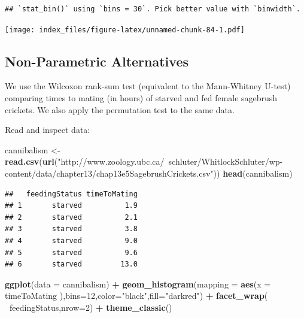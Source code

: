\documentclass[]{article}
\newenvironment{Shaded}{\begin{snugshade}}{\end{snugshade}}
\newcommand{\DataTypeTok}[1]{\textcolor[rgb]{0.13,0.29,0.53}{#1}}
\newcommand{\DecValTok}[1]{\textcolor[rgb]{0.00,0.00,0.81}{#1}}
\newcommand{\KeywordTok}[1]{\textcolor[rgb]{0.13,0.29,0.53}{\textbf{#1}}}
\newcommand{\NormalTok}[1]{#1}
\newcommand{\OperatorTok}[1]{\textcolor[rgb]{0.81,0.36,0.00}{\textbf{#1}}}
\newcommand{\StringTok}[1]{\textcolor[rgb]{0.31,0.60,0.02}{#1}}
\begin{document}
\begin{verbatim}
## `stat_bin()` using `bins = 30`. Pick better value with `binwidth`.
\end{verbatim}

\texttt{[image: index\_files/figure-latex/unnamed-chunk-84-1.pdf]}

\hypertarget{non-parametric-alternatives}{%
\subsection{Non-Parametric
Alternatives}\label{non-parametric-alternatives}}

We use the Wilcoxon rank-sum test (equivalent to the Mann-Whitney
U-test) comparing times to mating (in hours) of starved and fed female
sagebrush crickets. We also apply the permutation test to the same data.

Read and inspect data:

\begin{Shaded}
\begin{Highlighting}[]
\NormalTok{cannibalism <-}\StringTok{ }\KeywordTok{read.csv}\NormalTok{(}\KeywordTok{url}\NormalTok{(}\StringTok{"http://www.zoology.ubc.ca/~schluter/WhitlockSchluter/wp-content/data/chapter13/chap13e5SagebrushCrickets.csv"}\NormalTok{))}
\KeywordTok{head}\NormalTok{(cannibalism)}
\end{Highlighting}
\end{Shaded}

\begin{verbatim}
##   feedingStatus timeToMating
## 1       starved          1.9
## 2       starved          2.1
## 3       starved          3.8
## 4       starved          9.0
## 5       starved          9.6
## 6       starved         13.0
\end{verbatim}

\begin{Shaded}
\begin{Highlighting}[]
\KeywordTok{ggplot}\NormalTok{(}\DataTypeTok{data =}\NormalTok{ cannibalism) }\OperatorTok{+}
\StringTok{  }\KeywordTok{geom_histogram}\NormalTok{(}\DataTypeTok{mapping =} \KeywordTok{aes}\NormalTok{(}\DataTypeTok{x =}\NormalTok{ timeToMating ),}\DataTypeTok{bins=}\DecValTok{12}\NormalTok{,}\DataTypeTok{color=}\StringTok{"black"}\NormalTok{,}\DataTypeTok{fill=}\StringTok{"darkred"}\NormalTok{) }\OperatorTok{+}\StringTok{ }
\StringTok{  }\KeywordTok{facet_wrap}\NormalTok{( }\OperatorTok{~}\NormalTok{feedingStatus,}\DataTypeTok{nrow=}\DecValTok{2}\NormalTok{) }\OperatorTok{+}\StringTok{ }
\StringTok{  }\KeywordTok{theme_classic}\NormalTok{() }
\end{Highlighting}
\end{Shaded}
\end{document}

